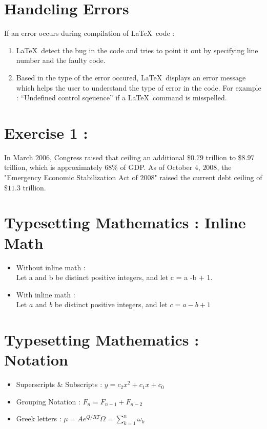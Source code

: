 \documentclass[12pt]{article}
\begin{document}
\section{Handeling Errors}
If an error occurs during compilation of \LaTeX \ code : 
\begin{enumerate}

\item \LaTeX \ detect the bug in the code and tries to point it out by specifying line number and the faulty code.
\item Based in the type of the error occured, \LaTeX \ displays an error message which helps the user to understand the type of error in the code. For example : ``Undefined control sqeuence''  if a \LaTeX \ command is misspelled.

\end{enumerate}

\section{Exercise 1 :}
In March \(\mathrm{2006}\), Congress raised that ceiling an additional \(\mathrm{\$0.79}\) trillion to \(\mathrm{\$8.97}\) trillion, which is approximately \(\mathrm{68\%}\) of GDP. As of October \(\mathrm{4}\), \(\mathrm{2008}\), the "Emergency Economic Stabilization Act of \(\mathrm{2008}\)" raised the current debt ceiling of \(\mathrm{\$11.3}\) trillion.


\section{Typesetting Mathematics : Inline Math}

\begin{itemize}

\item Without inline math : \\
Let a and b be distinct positive integers, and let c = a -b + 1.
\item With inline math : \\
Let $a$ and $b$ be distinct positive integers, and let $c=a-
b+1$

\end{itemize}

\section{Typesetting Mathematics : Notation}
\begin{itemize}
\item Superscripts \& Subscripts : $y = c_2x^2 + c_1x + c_0$
\item Grouping Notation : $F_n = F_{n-1} + F_{n-2}$ 
\item Greek letters : $\mu = A e^{{Q}/{RT}} \Omega = \sum_{k = 1}^{n} \omega_{k}$

\end{itemize}
\end{document}
